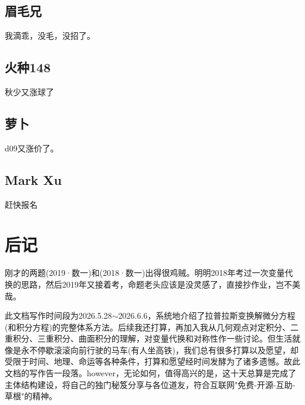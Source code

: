 \documentclass[12pt]{report}
\begin{document}
 \section*{眉毛兄}
 
 我滴乖，没毛，没招了。
 
 \section*{火种148}
 
 秋少又涨球了
 
 \section*{萝卜}
 
 d09又涨价了。
 
 \section*{Mark Xu}
 
 赶快报名
 
 
 
 

   
   
   \clearpage %
   
   
   \tableofcontents %
   \clearpage %
   
	\setcounter{chapter}{0} 
	 
	\clearpage
	
	\chapter*{后记}
     刚才的两题(2019·数一)和(2018·数一)出得很鸡贼。明明2018年考过一次变量代换的思路，然后2019年又接着考，命题老头应该是没灵感了，直接抄作业，岂不美哉。
     
     此文档写作时间段为2026.5.28$\sim$2026.6.6，系统地介绍了拉普拉斯变换解微分方程(和积分方程)的完整体系方法。后续我还打算，再加入我从几何观点对定积分、二重积分、三重积分、曲面积分的理解，对变量代换和对称性作一些讨论。但生活就像是永不停歇滚滚向前行驶的马车(有人坐高铁)，我们总有很多打算以及愿望，却受限于时间、地理、命运等各种条件，打算和愿望经时间发酵为了诸多遗憾。故此文档的写作告一段落。however，无论如何，值得高兴的是，这十天总算是完成了主体结构建设，将自己的独门秘笈分享与各位道友，符合互联网"免费-开源-互助-草根"的精神。
     
\end{document}
